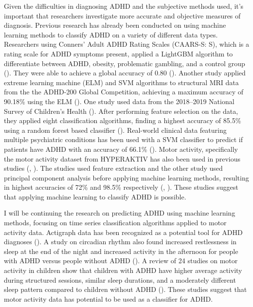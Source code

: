 \documentclass[,article,,moreauthors,pdftex]{mdpi}
\begin{document}
Given the difficulties in diagnosing ADHD and the subjective methods
used, it's important that researchers investigate more accurate and
objective measures of diagnosis. Previous research has already been
conducted on using machine learning methods to classify ADHD on a
variety of different data types. Researchers using Conners' Adult ADHD
Rating Scales (CAARS-S: S), which is a rating scale for ADHD symptoms
present, applied a LightGBM algorithm to differentiate between ADHD,
obesity, problematic gambling, and a control group
(\citet{christiansen_use_2020}). They were able to achieve a global
accuracy of 0.80 (\citet{christiansen_use_2020}). Another study applied
extreme learning machine (ELM) and SVM algorithms to structural MRI data
from the the ADHD-200 Global Competition, achieving a maximum accuracy
of 90.18\% using the ELM (\citet{peng_extreme_2013}). One study used
data from the 2018--2019 National Survey of Children's Health
(\citet{maniruzzaman_predicting_2022}). After performing feature
selection on the data, they applied eight classification algorithms,
finding a highest accuracy of 85.5\% using a random forest based
classifier (\citet{maniruzzaman_predicting_2022}). Real-world clinical
data featuring multiple psychiatric conditions has been used with a SVM
classifier to predict if patients have ADHD with an accuracy of 66.1\%
(\citet{mikolas_training_2022}). Motor activity, specifically the motor
activity dataset from HYPERAKTIV has also been used in previous studies
(\citet{10.1145/3458305.3478454}, \citet{kaur_accurate_2022}). The
studies used feature extraction and the other study used principal
component analysis before applying machine learning methods, resulting
in highest accuracies of 72\% and 98.5\% respectively
(\citet{10.1145/3458305.3478454}, \citet{kaur_accurate_2022}). These
studies suggest that applying machine learning to classify ADHD is
possible.

I will be continuing the research on predicting ADHD using machine
learning methods, focusing on time series classification algorithms
applied to motor activity data. Actigraph data has been recognized as a
potential tool for ADHD diagnoses (\citet{10.1145/3458305.3478454}). A
study on circadian rhythm also found increased restlessness in sleep at
the end of the night and increased activity in the afternoon for people
with ADHD versus people without ADHD (\citet{10.1145/3458305.3478454}).
A review of 24 studies on motor activity in children show that children
with ADHD have higher average activity during structured sessions,
similar sleep durations, and a moderately different sleep pattern
compared to children without ADHD (\citet{de_crescenzo_use_2016}). These
studies suggest that motor activity data has potential to be used as a
classifier for ADHD.
\end{document}
